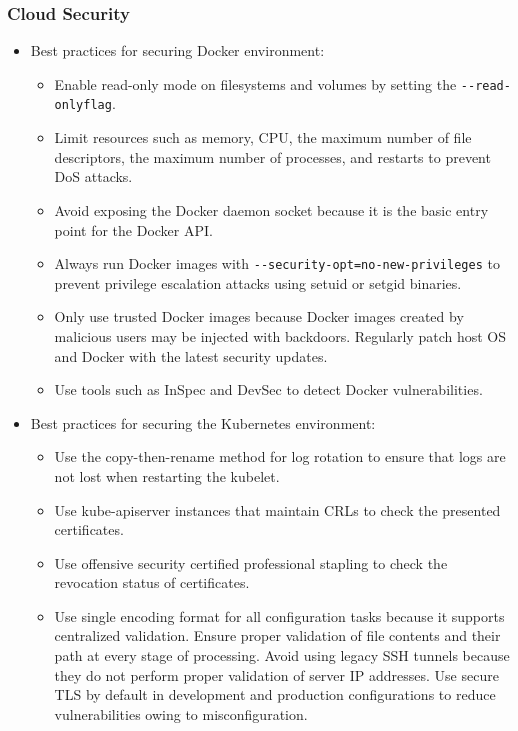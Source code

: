 \subsubsection{Cloud Security}
\begin{itemize}
    \item Best practices for securing Docker environment:
    \begin{itemize}
        \item Enable read-only mode on filesystems and volumes by setting the \verb|--read-onlyflag|.
        \item Limit resources such as memory, CPU, the maximum number of file descriptors, the maximum number of processes, and restarts to prevent DoS attacks.
        \item Avoid exposing the Docker daemon socket because it is the basic entry point for the Docker API.
        \item Always run Docker images with \verb|--security-opt=no-new-privileges| to prevent privilege escalation attacks using setuid or setgid binaries.
        \item Only use trusted Docker images because Docker images created by malicious users may be injected with backdoors.
        Regularly patch host OS and Docker with the latest security updates.
        \item Use tools such as InSpec and DevSec to detect Docker vulnerabilities.
    \end{itemize}
    \item Best practices for securing the Kubernetes environment:
    \begin{itemize}
        \item Use the copy-then-rename method for log rotation to ensure that logs are not lost when restarting the kubelet.
        \item Use kube-apiserver instances that maintain CRLs to check the presented certificates.
        \item Use offensive security certified professional stapling to check the revocation status of certificates.
        \item Use single encoding format for all configuration tasks because it supports centralized validation.
        Ensure proper validation of file contents and their path at every stage of processing.
        Avoid using legacy SSH tunnels because they do not perform proper validation of server IP addresses.
        Use secure TLS by default in development and production configurations to reduce vulnerabilities owing to misconfiguration.
    \end{itemize}
\end{itemize}

